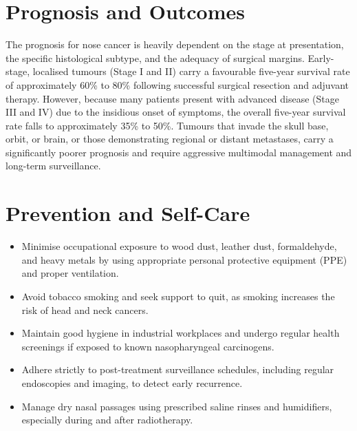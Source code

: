 \section*{Prognosis and Outcomes}
The prognosis for nose cancer is heavily dependent on the stage at presentation, the specific histological subtype, and the adequacy of surgical margins. Early-stage, localised tumours (Stage I and II) carry a favourable five-year survival rate of approximately 60\% to 80\% following successful surgical resection and adjuvant therapy. However, because many patients present with advanced disease (Stage III and IV) due to the insidious onset of symptoms, the overall five-year survival rate falls to approximately 35\% to 50\%. Tumours that invade the skull base, orbit, or brain, or those demonstrating regional or distant metastases, carry a significantly poorer prognosis and require aggressive multimodal management and long-term surveillance.

\section*{Prevention and Self-Care}
\begin{itemize}
    \item Minimise occupational exposure to wood dust, leather dust, formaldehyde, and heavy metals by using appropriate personal protective equipment (PPE) and proper ventilation.
    \item Avoid tobacco smoking and seek support to quit, as smoking increases the risk of head and neck cancers.
    \item Maintain good hygiene in industrial workplaces and undergo regular health screenings if exposed to known nasopharyngeal carcinogens.
    \item Adhere strictly to post-treatment surveillance schedules, including regular endoscopies and imaging, to detect early recurrence.
    \item Manage dry nasal passages using prescribed saline rinses and humidifiers, especially during and after radiotherapy.
\end{itemize}

